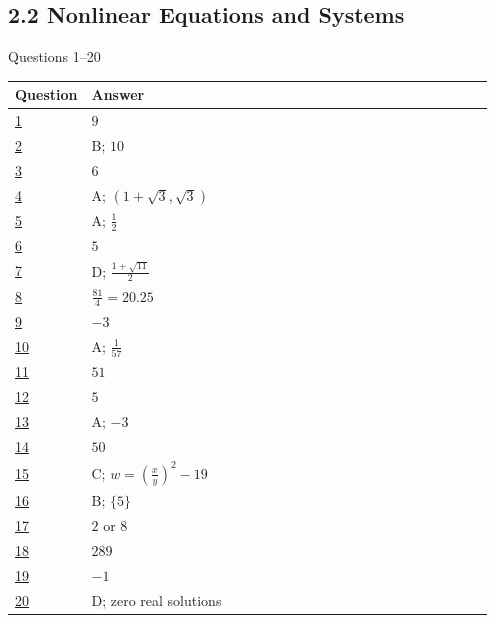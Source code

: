 \documentclass[11pt]{article}
\begin{document}
\subsection*{2.2 Nonlinear Equations and Systems}
{\small\color{NPgray}Questions 1--20}\par
\renewcommand{\arraystretch}{1.25}\begin{longtable}{@{}p{0.09\linewidth}p{0.86\linewidth}@{}}\toprule Question & Answer \\ \midrule\endhead
\hyperref[q24]{1} & $9$\\
\hyperref[q25]{2} & B; $10$\\
\hyperref[q26]{3} & $6$\\
\hyperref[q27]{4} & A; $(1+\sqrt3,\sqrt3)$\\
\hyperref[q28]{5} & A; $\frac12$\\
\hyperref[q29]{6} & $5$\\
\hyperref[q30]{7} & D; $\frac{1+\sqrt{11}}2$\\
\hyperref[q31]{8} & $\frac{81}{4}=20.25$\\
\hyperref[q32]{9} & $-3$\\
\hyperref[q33]{10} & A; $\frac1{57}$\\
\hyperref[q34]{11} & $51$\\
\hyperref[q35]{12} & $5$\\
\hyperref[q36]{13} & A; $-3$\\
\hyperref[q37]{14} & $50$\\
\hyperref[q38]{15} & C; $w=\left(\frac xy\right)^2-19$\\
\hyperref[q39]{16} & B; $\{5\}$\\
\hyperref[q40]{17} & $2$ or $8$\\
\hyperref[q41]{18} & $289$\\
\hyperref[q42]{19} & $-1$\\
\hyperref[q43]{20} & D; zero real solutions\\
\bottomrule\end{longtable}
\clearpage
\end{document}
